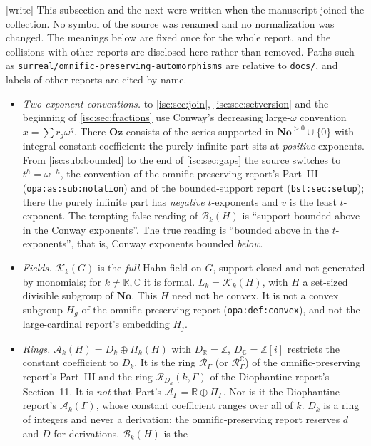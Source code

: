 \documentclass[11pt,letterpaper]{article}
\theoremstyle{definition}
\theoremstyle{remark}
\newcommand{\No}{\mathbf{No}}
\newcommand{\Oz}{\mathbf{Oz}}
\newcommand{\R}{\mathbb R}
\newcommand{\C}{\mathbb C}
\newcommand{\Z}{\mathbb Z}
\newcommand{\K}[2]{\mathcal K_{#1}(#2)}
\newcommand{\A}[2]{\mathcal A_{#1}(#2)}
\newcommand{\B}[2]{\mathcal B_{#1}(#2)}
\newcommand{\PiG}[2]{\Pi_{#1}(#2)}
\newcommand{\rpath}[1]{\nolinkurl{#1}}%
\newcommand{\lbl}[1]{\nolinkurl{#1}}%
\newcommand{\wtag}{\textup{[write]}}%
\numberwithin{equation}{section}
\begin{document}
\wtag{} This subsection and the next were written when the manuscript
joined the collection. No symbol of the source was renamed and no
normalization was changed. The meanings below are fixed once for the whole
report, and the collisions with other reports are disclosed here rather
than removed. Paths such as \rpath{surreal/omnific-preserving-automorphisms}
are relative to \rpath{docs/}, and labels of other reports are cited by
name.
\begin{itemize}[leftmargin=*,itemsep=3pt]
\item \emph{Two exponent conventions.}  to
\cref{isc:sec:join}, \cref{isc:sec:setversion} and the beginning of
\cref{isc:sec:fractions} use Conway's decreasing large-$\omega$ convention
$x=\sum r_g\omega^g$. There $\Oz$ consists of the series supported in
$\No^{>0}\cup\{0\}$ with integral constant coefficient: the purely infinite
part sits at \emph{positive} exponents. From \cref{isc:sub:bounded} to the end of
\cref{isc:sec:gaps} the source switches to $t^h=\omega^{-h}$, the convention
of the omnific-preserving report's Part~III (\lbl{opa:as:sub:notation}) and of
the bounded-support report (\lbl{bst:sec:setup}); there the purely infinite
part has \emph{negative} $t$-exponents and $v$ is the least $t$-exponent.
The tempting false reading of $\B{k}{H}$ is ``support bounded above in the
Conway exponents''. The true reading is ``bounded above in the
$t$-exponents'', that is, Conway exponents bounded \emph{below}.
\item \emph{Fields.} $\K{k}{G}$ is the \emph{full} Hahn field on $G$,
support-closed and not generated by monomials; for $k\ne\R,\C$ it is
formal. $L_k=\K{k}{H}$, with $H$ a set-sized divisible subgroup of $\No$.
This $H$ need not be convex. It is not a convex subgroup $H_g$ of the
omnific-preserving report (\lbl{opa:def:convex}), and not the large-cardinal
report's embedding $H_j$.
\item \emph{Rings.} $\A{k}{H}=D_k\oplus\PiG{k}{H}$ with $D_\R=\Z$,
$D_\C=\Z[i]$ restricts the constant coefficient to $D_k$. It is the ring
$\mathcal R_\Gamma$ (or $\mathcal R^\C_\Gamma$) of the omnific-preserving
report's Part~III and the ring $\mathcal R_{D_k}(k,\Gamma)$ of the
Diophantine report's Section~11. It is \emph{not} that Part's
$\mathcal A_\Gamma=\R\oplus\Pi_\Gamma$. Nor is it the Diophantine report's
$\mathcal A_k(\Gamma)$, whose constant coefficient ranges over all of $k$.
$D_k$ is a ring of integers and never a derivation; the omnific-preserving
report reserves $d$ and $D$ for derivations. $\B{k}{H}$ is the

\end{itemize}
\end{document}
